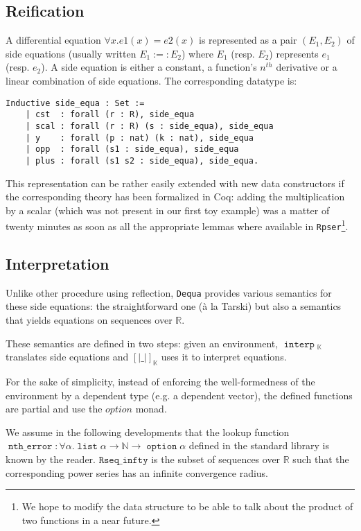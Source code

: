 \documentclass{article}
\newcommand{\coq}{Coq}
\newcommand{\N}{\mathbb{N}}
\newcommand{\R}{\mathbb{R}}
\newcommand{\dequa}{\texttt{Dequa}}
\newcommand{\Rpser}{\texttt{Rpser}}
\DeclareMathOperator{\ntherr}{\mathtt{nth\_error}}
\DeclareMathOperator{\option}{\mathtt{option}}
\DeclareMathOperator{\alist}{\mathtt{list}}
\DeclareMathOperator{\Interp}{\mathtt{interp}}
\begin{document}
\subsection{Reification}

A differential equation $\forall x. e1(x) = e2(x)$ is represented as a pair
$(E_1, E_2)$ of side equations (usually written $E_1 :=: E_2$) where $E_1$ (resp.
$E_2$) represents $e_1$ (resp. $e_2$). A side equation is either a constant,
a function's $n^{th}$ derivative or a linear combination of side equations. The
corresponding datatype is:

\begin{verbatim}
Inductive side_equa : Set :=
    | cst  : forall (r : R), side_equa
    | scal : forall (r : R) (s : side_equa), side_equa
    | y    : forall (p : nat) (k : nat), side_equa
    | opp  : forall (s1 : side_equa), side_equa
    | plus : forall (s1 s2 : side_equa), side_equa.
\end{verbatim}

This representation can be rather easily extended with new data constructors if
the corresponding theory has been formalized in \coq{}: adding the multiplication
by a scalar (which was not present in our first toy example) was a matter of twenty
minutes as soon as all the appropriate lemmas where available in
\Rpser{}\footnote{We hope to modify the data structure to be able to talk about
the product of two functions in a near future.}.

\subsection{Interpretation}

Unlike other procedure using reflection, \dequa{} provides various semantics for
these side equations: the straightforward one (\`a la Tarski) but also a semantics
that yields equations on sequences over $\R$.

These semantics are defined in two steps: given an environment,
$\Interp{}_{\mathbb{K}}$ translates side equations and
$\left[\left| \_ \right|\right]_{\mathbb{K}}$ uses it to interpret equations.

For the sake of simplicity, instead of enforcing the well-formedness of the
environment by a dependent type (e.g. a dependent vector),
the defined functions are partial and use the $option{}$ monad.

We assume in the following developments that the lookup function
$\ntherr : \forall \alpha. \alist{} \alpha \rightarrow \N \rightarrow \option{}
\alpha$ defined in the standard library is known by the reader. $\mathtt{Rseq\_
infty}$ is the subset of sequences over $\R$ such that the corresponding power
series has an infinite convergence radius.
\end{document}
